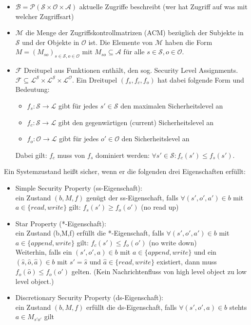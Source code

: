 \documentclass[a4paper,twoside,DIV15,BCOR12mm]{scrbook}
\begin{document}
\begin{itemize}
	\item $\mathcal{B} = \mathcal{P}(\mathcal{S} \times \mathcal{O} \times \mathcal{A})$ aktuelle Zugriffe beschreibt (wer hat Zugriff auf was mit welcher Zugriffsart)
	\item $\mathcal{M}$ die Menge der Zugriffskontrollmatrizen (ACM) bezüglich der Subjekte in $\mathcal{S}$ und der Objekte in $\mathcal{O}$ ist. Die Elemente von $\mathcal{M}$ haben die Form $M = (M_{so})_{s \in \mathcal{S}, o \in \mathcal{O}}$ mit $M_{so} \subseteq \mathcal{A}$ für alle $s \in \mathcal{S}, o \in \mathcal{O}$.
	\item $\mathcal{F}$ Dreitupel aus Funktionen enthält, den sog. Security Level Assignments. $\mathcal{F} \subseteq \mathcal{L}^\mathcal{S} \times \mathcal{L}^\mathcal{S} \times \mathcal{L}^\mathcal{O}$. Ein Dreitupel $(f_s, f_c, f_o)$ hat dabei folgende Form und Bedeutung:
		\begin{itemize}
			\item $f_s \colon \mathcal{S} \rightarrow \mathcal{L}$ gibt für jedes $s' \in \mathcal{S}$ den maximalen Sicherheitslevel an
			\item $f_c \colon \mathcal{S} \rightarrow \mathcal{L}$ gibt den gegenwärtigen (current) Sicherheitslevel an
			\item $f_o \colon \mathcal{O} \rightarrow \mathcal{L}$ gibt für jedes $o' \in \mathcal{O}$ den Sicherheitslevel an
		\end{itemize}
		Dabei gilt: $f_c$ muss von $f_s$ dominiert werden: $\forall s' \in \mathcal{S} \colon f_c(s') \leq f_s(s')$.
\end{itemize}

Ein Systemzustand heißt sicher, wenn er die folgenden drei Eigenschaften erfüllt:

\begin{itemize}
	\item Simple Security Property (ss-Eigenschaft):\\ ein Zustand $(b,M,f)$ genügt der ss-Eigenschaft, falls $\forall (s',o',a') \in b$ mit $a \in \{read, write\}$ gilt: $f_s(s') \geq f_o(o')$ (\glqq no read up\grqq)
	\item Star Property (*-Eigenschaft):\\ ein Zustand (b,M,f) erfüllt die *-Eigenschaft, falls $\forall (s',o',a') \in b$ mit $a \in \{append, write\}$ gilt: $f_c(s') \leq f_o(o')$ (\glqq no write down\grqq)\\ Weiterhin, falls ein $(s', o',a) \in b$ mit $a \in \{append, write\}$ und ein $(\hat s, \hat o, \hat a) \in b$ mit $s' = \hat s$ und $\hat a \in \{read, write\}$ existiert, dann muss $f_o(\hat o) \leq f_o(o')$ gelten. (\glqq Kein Nachrichtenfluss von high level object zu low level object.\grqq)
	\item Discretionary Security Property (ds-Eigenschaft):\\ ein Zustand $(b,M,f)$ erfüllt die ds-Eigenschaft, falls $\forall (s',o',a) \in b$ stehts $a \in M_{s'o'}$ gilt
\end{itemize}
\end{document}
